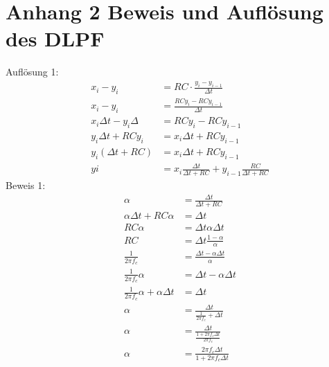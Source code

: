 \documentclass[12pt,a4paper, ngerman]{article}
\begin{document}
\section{Anhang 2 Beweis und Auflösung des DLPF}
Auflösung 1:
\begin{align*} 
x_{i}-y_{i}&=RC\cdot \frac{y_{i}-y_{i-1}}{\Delta t} \\ 
x_{i}-y_{i}&=\frac{RCy_{i}-RCy_{i-1}}{\Delta t}\\
x_{i}\Delta t-y_{i}\Delta&=RCy_{i}-RCy_{i-1} \\
y_{i}\Delta t+RCy_{i}&=x_{i}\Delta t+RCy_{i-1} \\
y_{i}(\Delta t+RC)&=x_{i}\Delta t+RCy_{i-1} \\
y{i}&=x_{i}\frac{\Delta t}{\Delta t+RC} + y_{i-1}\frac{RC}{\Delta t+RC}
\end{align*}
Beweis 1:
\begin{align*}
\alpha&=\frac{\Delta t}{\Delta t+RC} \\
\alpha \Delta t+RC\alpha &= \Delta t \\
RC\alpha &= \Delta t \alpha \Delta t \\
RC &= \Delta t \frac{1-\alpha}{\alpha}\\
\frac{1}{2\pi f_{c}} &= \frac{\Delta t -\alpha\Delta t}{\alpha} \\
\frac{1}{2\pi f_{c}} \alpha &= \Delta t -\alpha\Delta t \\
\frac{1}{2\pi f_{c}} \alpha + \alpha\Delta t &= \Delta t \\
\alpha &= \frac{\Delta t}{\frac{1}{2\pi f_{c}} + \Delta t} \\
\alpha &= \frac{\Delta t}{\frac{1+2\pi f_{c}\Delta t}{2\pi f_{c}}} \\
\alpha &= \frac{2\pi f_{c}\Delta t}{1+2\pi f_{c}\Delta t} 
\end{align*}
\end{document}
